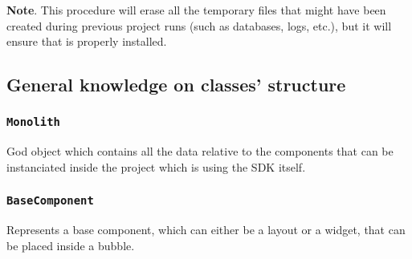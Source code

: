 %	
%
%	

	


\textbf{Note}. This procedure will erase all the temporary files that might have been created during previous project runs (such as databases, logs, etc.), but it will ensure that  is properly installed.


\subsection{General knowledge on classes' structure}
\subsubsection{\texttt{Monolith}}
God object which contains all the data relative to the components that can be instanciated inside the project which is using the SDK itself.

\subsubsection{\texttt{BaseComponent}}
Represents a base component, which can either be a layout or a widget, that can be placed inside a bubble.

